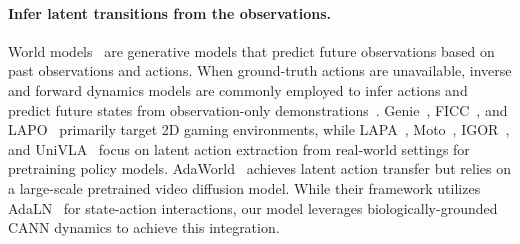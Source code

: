 \paragraph{Infer latent transitions from the observations.}
World models~\citep{haWorldModels2018,lecunPathAutonomousMachine} are generative models that predict future observations based on past observations and actions. When ground-truth actions are unavailable, inverse and forward dynamics models are commonly employed to infer actions and predict future states from observation-only demonstrations~\citep{bruceGenieGenerativeInteractive2024, yeBECOMEPROFICIENTPLAYER2023, lapo}.
Genie~\citep{bruceGenieGenerativeInteractive2024}, FICC~\citep{yeBECOMEPROFICIENTPLAYER2023}, and LAPO~\citep{lapo} primarily target 2D gaming environments, while
LAPA~\citep{yeLatentActionPretraining2024}, Moto~\citep{chenMotoLatentMotion2024}, IGOR~\citep{chenIGORImageGOalRepresentations2024}, and UniVLA~\citep{bu2025univla} focus on latent action extraction from real-world settings for pretraining policy models.
AdaWorld~\citep{gaoAdaWorldLearningAdaptable2025b} achieves latent action transfer but relies on a large-scale pretrained video diffusion model. While their framework utilizes AdaLN~\citep{peebles2023scalable} for state-action interactions, our model leverages biologically-grounded CANN dynamics to achieve this integration. 
